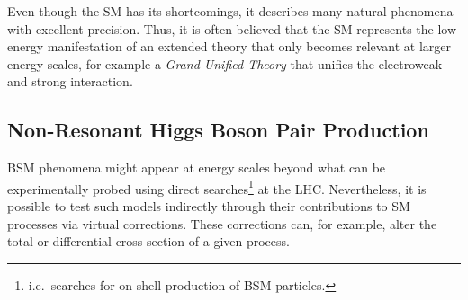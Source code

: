 \begin{description}





\end{description}
Even though the SM has its shortcomings, it describes many natural phenomena
with excellent precision. Thus, it is often believed that the SM represents the
low-energy manifestation of an extended theory that only becomes relevant at
larger energy scales, for example a \emph{Grand Unified Theory} that unifies the
electroweak and strong interaction.


\subsection{Non-Resonant Higgs Boson Pair Production}%
\label{sec:bsm_nonresonant_hh}

BSM phenomena might appear at energy scales beyond what can be experimentally
probed using direct searches\footnote{i.e.\ searches for on-shell production of
  BSM particles.} at the LHC. Nevertheless, it is possible to test such models
indirectly through their contributions to SM processes via virtual
corrections. These corrections can, for example, alter the total or differential
cross section of a given process.

